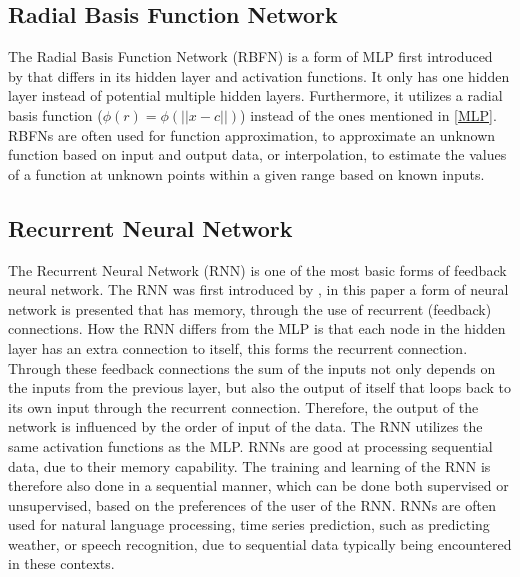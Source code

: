 \documentclass[conference]{IEEEtran}
\begin{document}
\subsection{Radial Basis Function Network} \label{RBFN}
The Radial Basis Function Network (RBFN) is a form of MLP first introduced by \cite{moody1989fast} that differs in its hidden layer and activation functions. It only has one hidden layer instead of potential multiple hidden layers. Furthermore, it utilizes a radial basis function ($\phi(r) = \phi(||x - c||)$) instead of the ones mentioned in \autoref{MLP}. RBFNs are often used for function approximation, to approximate an unknown function based on input and output data, or interpolation, to estimate the values of a function at unknown points within a given range based on known inputs.

\subsection{Recurrent Neural Network} \label{RNN}
The Recurrent Neural Network (RNN) is one of the most basic forms of feedback neural network. The RNN was first introduced by \cite{elman1990finding}, in this paper a form of neural network is presented that has memory, through the use of recurrent (feedback) connections. How the RNN differs from the MLP is that each node in the hidden layer has an extra connection to itself, this forms the recurrent connection. Through these feedback connections the sum of the inputs not only depends on the inputs from the previous layer, but also the output of itself that loops back to its own input through the recurrent connection. Therefore, the output of the network is influenced by the order of input of the data. The RNN utilizes the same activation functions as the MLP. RNNs are good at processing sequential data, due to their memory capability. The training and learning of the RNN is therefore also done in a sequential manner, which can be done both supervised or unsupervised, based on the preferences of the user of the RNN. RNNs are often used for natural language processing, time series prediction, such as predicting weather, or speech recognition, due to sequential data typically being encountered in these contexts.
\end{document}

